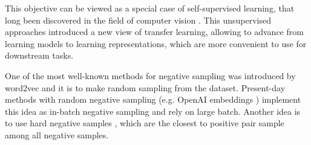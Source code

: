 \documentclass{article}
\begin{document}
This objective can be viewed as a special case of self-supervised learning, that long been discovered in the field of computer vision \cite{noroozi2017unsupervised, doersch2017multitask, wu2018unsupervised, oord2019representation}. This unsupervised approaches introduced a new view of transfer learning, allowing to advance from learning models to learning representations, which are more convenient to use for downstream tasks.


One of the most well-known methods for negative sampling was introduced by word2vec \cite{mikolov2013efficient} and it is to make random sampling from the dataset. Present-day methods with random negative sampling (e.g. OpenAI embeddings \cite{neelakantan2022text}) implement this idea as in-batch negative sampling and rely on large batch. Another idea is to use hard negative samples \cite{xiong2020approximate, feng2022languageagnostic}, which are the closest to positive pair sample among all negative samples. 

\end{document}
